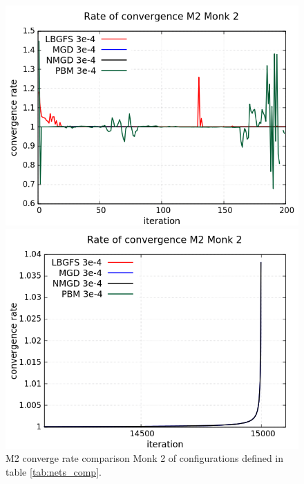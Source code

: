 \begin{figure}[H]
	\centering
	\begin{minipage}[t]{0.525\linewidth}		
		\includegraphics[width=\linewidth]{data/Comparison/Monk2/Monk2_M2_CR_zoomLeft.png}
	\end{minipage}%
	\begin{minipage}[t]{0.525\linewidth}
		\includegraphics[width=\linewidth]{data/Comparison/Monk2/Monk2_M2_CR_zoomRight.png}
	\end{minipage}
	\caption{M2 converge rate comparison Monk 2 of configurations defined in table \ref{tab:nets_comp}.}
	\label{fig:CR-M2-Monk2-Zoom}
\end{figure}

